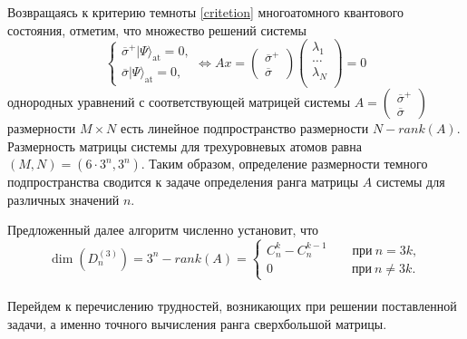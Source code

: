 Возвращаясь к критерию темноты \eqref{critetion} многоатомного квантового состояния, отметим, что множество решений системы
\begin{equation}\label{slae}
	\begin{cases}
		\overline{\sigma}^{+}|\Psi\rangle_{\text{at}} = 0,\\
		\overline{\sigma}|\Psi\rangle_{\text{at}} = 0,
	\end{cases} \Leftrightarrow
	Ax =
	\begin{pmatrix}
		\overline{\sigma}^{+}\\
		\overline{\sigma}
	\end{pmatrix}
	\begin{pmatrix}
		\lambda_1\\
		\dots\\
		\lambda_N\\
	\end{pmatrix} = 0
\end{equation}
однородных уравнений с соответствующей матрицей системы
$
A=\begin{pmatrix}
	\overline{\sigma}^{+}\\
	\overline{\sigma}
\end{pmatrix}
$ размерности $M \times N$ есть линейное подпространство размерности $N -
rank(A)$. Размерность матрицы системы для трехуровневых атомов равна $(M, N) = (6 \cdot 3^{n}, 3^{n})$. Таким образом, определение размерности темного подпространства сводится к задаче определения ранга матрицы $A$ системы для различных значений $n$.

Предложенный далее алгоритм численно установит, что
\begin{equation}\label{eq:dim3}
	\dim(D^{(3)}_{n}) = 3^{n} - rank(A) =
	\begin{cases}
		C_{n}^{k} - C_{n}^{k-1}\qquad\text{при}~n=3k,\\
		0\quad\qquad\qquad\quad~\text{при}~n \ne 3k.
	\end{cases}
\end{equation}
\
\\[12pt]
\indent Перейдем к перечислению трудностей, возникающих при решении поставленной задачи, а именно точного вычисления ранга сверхбольшой матрицы.

